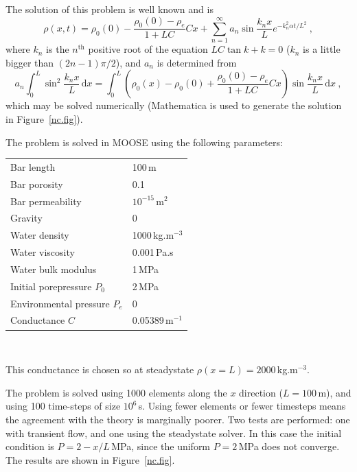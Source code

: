 The solution of this problem is well known and is
\begin{equation}
\rho(x, t) = \rho_{0}(0) - \frac{\rho_{0}(0) - \rho_{e}}{1 + LC}Cx +
\sum_{n=1}^{\infty} a_{n}\sin \frac{k_{n}x}{L}e^{-k_{n}^{2}\alpha
  t/L^{2}} \ ,
\end{equation}
where $k_{n}$ is the $n^{\mathrm{th}}$ positive root of the equation
$LC\tan k + k=0$  ($k_{n}$ is a little bigger than
$(2n-1)\pi/2$), and $a_{n}$ is determined from
\begin{equation}
a_{n}\int_{0}^{L}\sin^{2}\frac{k_{n}x}{L}\,\mathrm{d}x =
\int_{0}^{L}\left(\rho_{0}(x) - \rho_{0}(0) + \frac{\rho_{0}(0) -
  \rho_{e}}{1 + LC}Cx\right)\sin \frac{k_{n}x}{L}\,\mathrm{d}x \ ,
\end{equation}
which may be solved numerically (Mathematica is used to generate
the solution in Figure~\ref{nc.fig}).

\noindent The problem is solved in MOOSE using the following parameters:
\begin{center}
\begin{tabular}{|ll|}
\hline
Bar length & 100\,m \\
Bar porosity & 0.1 \\
Bar permeability & $10^{-15}$\,m$^{2}$ \\
\hline
Gravity & 0 \\
\hline
Water density & 1000\,kg.m$^{-3}$ \\
Water viscosity & 0.001\,Pa.s \\
Water bulk modulus & 1\,MPa \\
\hline
Initial porepressure $P_{0}$ & 2\,MPa \\
Environmental pressure $P_{e}$ & 0 \\
\hline
Conductance $C$ & 0.05389\,m$^{-1}$ \\
\hline
\end{tabular} \\
\end{center}
This conductance is chosen so at steadystate $\rho(x=L)=2000$\,kg.m$^{-3}$.

The problem is solved using 1000 elements along the $x$ direction
($L=100$\,m), and using 100 time-steps of size $10^6$\,s.  Using fewer
elements or fewer timesteps means the agreement with the theory is
marginally poorer.  Two tests are performed: one with transient flow,
and one using the steadystate solver.  In this case the initial
condition is $P=2-x/L$\,MPa, since the uniform $P=2$\,MPa does not
converge.  The results are shown in Figure~\ref{nc.fig}.

